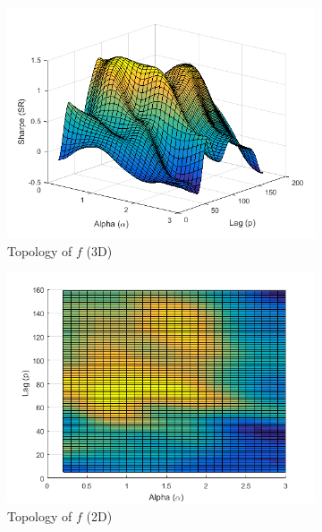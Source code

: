 \documentclass[11pt,a4,twosided,singlespacing,titlepagenumber=on]{scrreprt}
\numberwithin{equation}{chapter} %
\theoremstyle{remark}
\begin{document}
\begin{figure}[H]
    \centering
    \begin{subfigure}[t]{0.49\textwidth}
        \centering
        \includegraphics[width=1\textwidth]{surf/1}
        \caption{Topology of $f$ (3D)}
        \label{}
    \end{subfigure}
    \begin{subfigure}[t]{0.49\textwidth}
        \centering
        \includegraphics[width=1\textwidth]{surf/2}
        \caption{Topology of $f$ (2D)}
        \label{vol_mod_sma}
    \end{subfigure}
    \begin{subfigure}[t]{0.49\textwidth}
        \centering

\end{subfigure}
\end{figure}
\end{document}
